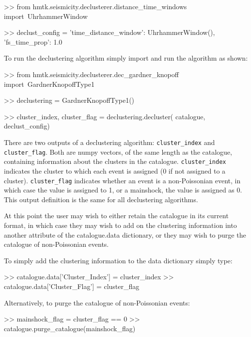 \begin{python}[frame=single]
>> from hmtk.seismicity.declusterer.distance_time_windows import\
    UhrhammerWindow

>> declust_config = {
    'time_distance_window': UhrhammerWindow(),
    'fs_time_prop': 1.0}
\end{python}


To run the declustering algorithm simply import and run the algorithm as shown:

\begin{python}[frame=single]
>> from hmtk.seismicity.declusterer.dec_gardner_knopoff import\
    GardnerKnopoffType1

>> declustering = GardnerKnopoffType1()

>> cluster_index, cluster_flag = declustering.decluster(
    catalogue,
    declust_config)
\end{python}

There are two outputs of a declustering algorithm: \verb=cluster_index= and \verb=cluster_flag=. Both are numpy vectors, of the same length as the catalogue, containing information about the clusters in the catalogue. \verb=cluster_index= indicates the cluster to which each event is assigned (0 if not assigned to a cluster). \verb=cluster_flag= indicates whether an event is a non-Poissonian event, in which case the value is assigned to 1, or a mainshock, the value is assigned as 0. This output definition is the same for all declustering algorithms.

At this point the user may wish to either retain the catalogue in its current format, in which case they may wish to add on the clustering information into another attribute of the catalogue.data dictionary, or they may wish to purge the catalogue of non-Poissonian events. 

To simply add the clustering information to the data dictionary simply type:

\begin{python}[frame=single]
>> catalogue.data['Cluster_Index'] = cluster_index
>> catalogue.data['Cluster_Flag'] = cluster_flag
\end{python}
 
Alternatively, to purge the catalogue of non-Poissonian events:

\begin{python}[frame=single]
>> mainshock_flag = cluster_flag == 0
>> catalogue.purge_catalogue(mainshock_flag)
\end{python}


